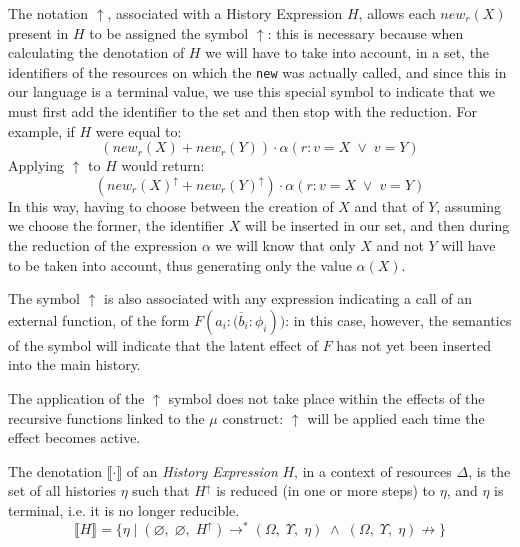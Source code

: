 \begin{notation}[$\uparrow$]
    The notation $\uparrow$, associated with a History Expression $H$, allows each $new_r(X)$ present in $H$ to be assigned the symbol $\uparrow$: this is necessary because when calculating the denotation of $H$ we will have to take into account, in a set, the identifiers of the resources on which the \verb|new| was actually called, and since this in our language is a terminal value, we use this special symbol to indicate that we must first add the identifier to the set and then stop with the reduction.
    For example, if $H$ were equal to:
    \begin{equation}
        (new_r(X) + new_r(Y)) \cdot \alpha(r: v = X \;\lor\; v = Y)
    \end{equation}
    Applying $\uparrow$ to $H$ would return:
    \begin{equation}
        (new_r(X)^{\uparrow} + new_r(Y)^{\uparrow}) \cdot \alpha(r: v = X \;\lor\; v = Y)
    \end{equation}
    In this way, having to choose between the creation of $X$ and that of $Y$, assuming we choose the former, the identifier $X$ will be inserted in our set, and then during the reduction of the expression $\alpha$ we will know that only $X$ and not $Y$ will have to be taken into account, thus generating only the value $\alpha(X)$.

    The symbol $\uparrow$ is also associated with any expression indicating a call of an external function, of the form $F(\overline{a_i{:}(b_i{:}\phi_i}))$: in this case, however, the semantics of the symbol will indicate that the latent effect of $F$ has not yet been inserted into the main history. 
    
    The application of the $\uparrow$ symbol does not take place within the effects of the recursive functions linked to the $\mu$ construct: $\uparrow$ will be applied each time the effect becomes active.
\end{notation}

\begin{definition}\label{def:history_den}
    The denotation $\llbracket \cdot \rrbracket$ of an \emph{History Expression} $H$, in a context of resources $\Delta$, is the set of all histories $\eta$ such that $H^{\uparrow}$ is reduced (in one or more steps) to $\eta$, and $\eta$ is terminal, i.e. it is no longer reducible.
    \begin{equation}
        \llbracket H \rrbracket = \{ \eta \;|\; (\varnothing, \;\varnothing, \;H^{\uparrow}) \rightarrow^* (\Omega, \;\Upsilon, \;\eta) \;\land\; (\Omega, \;\Upsilon, \;\eta) \nrightarrow \}
    \end{equation}
\end{definition}

